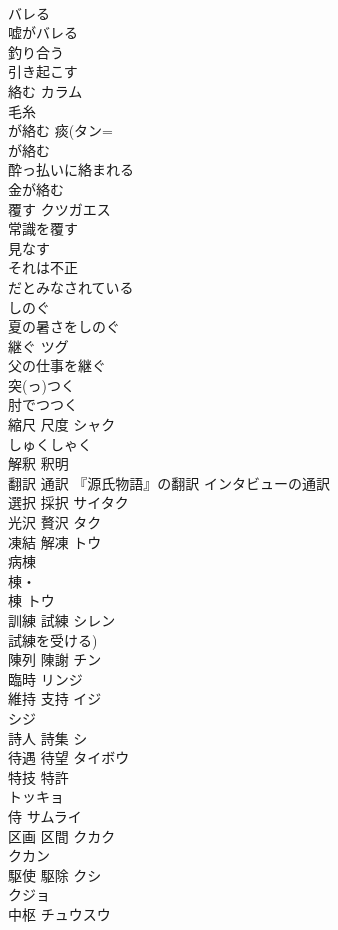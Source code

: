 \documentclass[8pt]{extreport}
\begin{document}
\begin{CJK}{UTF8}{min}
\\	バレる	
\\	嘘がバレる
\\	釣り合う	
\\	引き起こす	
\\	絡む	カラム 
\\	毛糸
\\	が絡む 痰(タン=
\\	が絡む 
\\	酔っ払いに絡まれる 
\\	金が絡む
\\	覆す	クツガエス 
\\	常識を覆す 
\\	見なす	
\\	それは不正
\\	だとみなされている
\\	しのぐ	
\\	夏の暑さをしのぐ
\\	継ぐ	ツグ 
\\	父の仕事を継ぐ 
\\	突(っ)つく	
\\	肘でつつく
\\	縮尺 尺度	シャク 
\\	しゅくしゃく 
\\	解釈 釈明	
\\	翻訳 通訳	『源氏物語』の翻訳 インタビューの通訳
\\	選択 採択	サイタク 
\\	光沢 贅沢	タク 
\\	凍結 解凍	トウ 
\\	病棟 
\\	棟・
\\	棟	トウ 
\\	訓練 試練	シレン 
\\	試練を受ける)
\\	陳列 陳謝	チン 
\\	臨時	リンジ 
\\	維持 支持	イジ 
\\	シジ 
\\	詩人 詩集	シ 
\\	待遇 待望	タイボウ 
\\	特技 特許	
\\	トッキョ
\\	侍	サムライ
\\	区画 区間	クカク　
\\	クカン 
\\	駆使 駆除	クシ 
\\	クジョ 
\\	中枢	チュウスウ 

\end{CJK}
\end{document}
